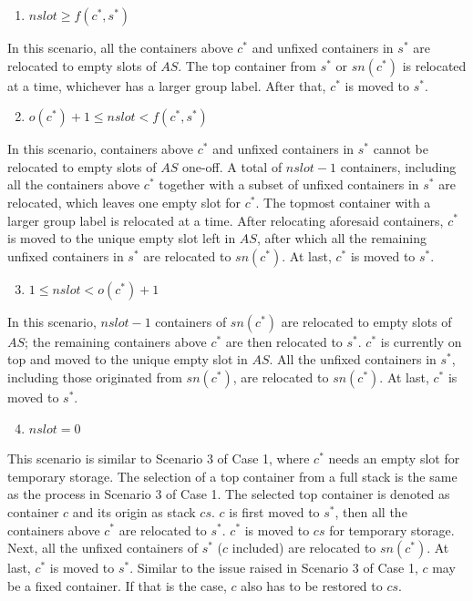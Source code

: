 \documentclass[review,3p,times,authoryear,12pt]{elsarticle}
\begin{document}
\begin{enumerate}
\setcounter{enumi}{0}
\item $\mathit{nslot}\ge f(c^*,s^*)$
\end{enumerate}

In this scenario, all the containers above $c^*$ and unfixed containers in $s^*$ are relocated to empty slots of $\mathit{AS}$. The top container from $s^*$ or $\mathit{sn}(c^*)$ is relocated at a time, whichever has a larger group label. After that, $c^*$ is moved to $s^*$.

\begin{enumerate}
\setcounter{enumi}{1}
\item $o(c^*)+1\le\mathit{nslot}< f(c^*,s^*)$
\end{enumerate}

In this scenario, containers above $c^*$ and unfixed containers in $s^*$ cannot be relocated to empty slots of $\mathit{AS}$ one-off.
A total of $\mathit{nslot}-1$ containers, including all the containers above $c^*$ together with a subset of unfixed containers in $s^*$ are relocated, which leaves one empty slot for $c^*$.
The topmost container with a larger group label is relocated at a time.
After relocating aforesaid containers, $c^*$ is moved to the unique empty slot left in $\mathit{AS}$, after which all the remaining unfixed containers in $s^*$ are relocated to $\mathit{sn}(c^*)$.
At last, $c^*$ is moved to $s^*$.

\begin{enumerate}
\setcounter{enumi}{2}
\item $1\le\mathit{nslot}< o(c^*)+1$
\end{enumerate}

In this scenario, $\mathit{nslot}-1$ containers of $\mathit{sn}(c^*)$ are relocated to empty slots of $\mathit{AS}$; the remaining containers above $c^*$ are then relocated to $s^*$.
$c^*$ is currently on top and moved to the unique empty slot in $\mathit{AS}$.
All the unfixed containers in $s^*$, including those originated from $\mathit{sn}(c^*)$, are relocated to $\mathit{sn}(c^*)$.
At last, $c^*$ is moved to $s^*$.

\begin{enumerate}
\setcounter{enumi}{3}
\item $\mathit{nslot}=0$
\end{enumerate}

This scenario is similar to Scenario 3 of Case 1, where $c^*$ needs an empty slot for temporary storage.
The selection of a top container from a full stack is the same as the process in Scenario 3 of Case 1.
The selected top container is denoted as container $c$ and its origin as stack $\mathit{cs}$.
$c$ is first moved to $s^*$, then all the containers above $c^*$ are relocated to $s^*$.
$c^*$ is moved to $\mathit{cs}$ for temporary storage.
Next, all the unfixed containers of $s^*$ ($c$ included) are relocated to $\mathit{sn}(c^*)$.
At last, $c^*$ is moved to $s^*$.
Similar to the issue raised in Scenario 3 of Case 1, $c$ may be a fixed container.
If that is the case, $c$ also has to be restored to $\mathit{cs}$.
\end{document}

